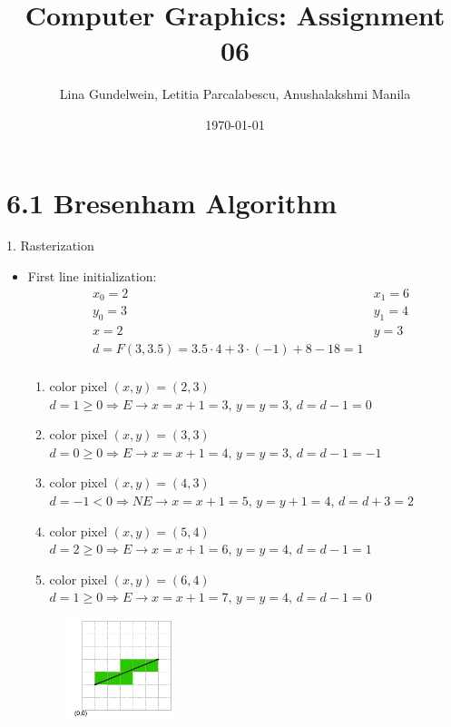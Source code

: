 \documentclass{article}
\title{Computer Graphics: Assignment 06} %
\author{Lina Gundelwein, Letitia Parcalabescu, Anushalakshmi Manila} %
\date{\today} %
\begin{document}
\maketitle 

\section*{6.1 Bresenham Algorithm}
1. Rasterization
\begin{itemize}
\item First line initialization: 
\begin{align*}
& x_0 = 2 & x_1 = 6\\
& y_0 = 3 & y_1 = 4\\
& x = 2 & y = 3 \\
& d = F(3,3.5) = 3.5 \cdot 4 + 3\cdot(-1) + 8-18 =1\\
\end{align*}
\begin{enumerate}
\item color pixel $(x,y) = (2,3)$\\$d = 1 \geq 0 \Rightarrow E \rightarrow x = x+1 = 3,\, y = y = 3,\, d = d-1 = 0$
\item color pixel $(x,y) = (3,3)$\\$d = 0 \geq 0 \Rightarrow E \rightarrow x = x+1 = 4,\, y = y = 3,\, d = d-1 = -1$
\item color pixel $(x,y) = (4,3)$\\$d = -1 < 0 \Rightarrow NE \rightarrow x = x+1 = 5,\, y = y+1 = 4,\, d = d+3 = 2$
\item color pixel $(x,y) = (5,4)$\\$d = 2 \geq 0 \Rightarrow E \rightarrow x = x+1 = 6,\, y = y = 4,\, d = d-1 = 1$
\item color pixel $(x,y) = (6,4)$\\$d = 1 \geq 0 \Rightarrow E \rightarrow x = x+1 = 7,\, y = y = 4,\, d = d-1 = 0$
\end{enumerate}
\begin{figure}[htb]
\centering
\includegraphics[width = 0.3\textwidth]{line1.png}
\end{figure}

\end{itemize}
\end{document}
